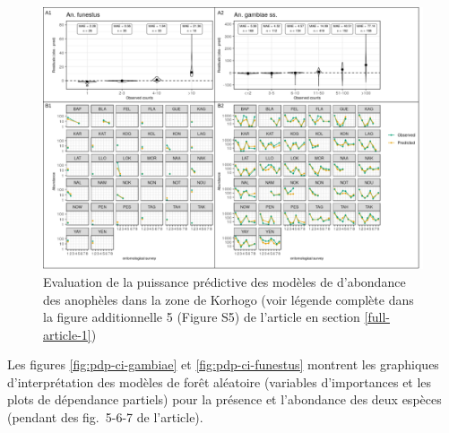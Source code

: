 \documentclass[12pt,twoside]{reedthesis}
\begin{document}
\begin{figure}

{\centering \includegraphics[width=1\linewidth]{figure/modelevaluation_ci_abundance} 

}

\caption[Evaluation de la puissance prédictive des modèles d'abondance des anophèles dans la zone de Korhogo]{Evaluation de la puissance prédictive des modèles de d'abondance des anophèles dans la zone de Korhogo (voir légende complète dans la figure additionnelle 5 (Figure S5) de l'article en section \ref{full-article-1})}\label{fig:evaluation-plot-ci-abundance}
\end{figure}
Les figures \ref{fig:pdp-ci-gambiae} et \ref{fig:pdp-ci-funestus} montrent les graphiques d'interprétation des modèles de forêt aléatoire (variables d'importances et les plots de dépendance partiels) pour la présence et l'abondance des deux espèces (pendant des fig.~5-6-7 de l'article).\\
\end{document}
